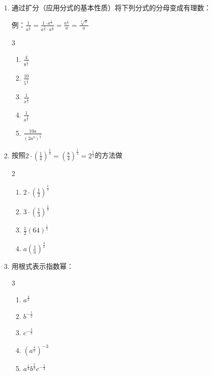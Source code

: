 \begin{enumerate}
\item 通过扩分（应用分式的基本性质）将下列分式的分母变成有理数：

例：$\frac{1}{a^{\tfrac{2}{3}}}=\frac{1\cdot a^{\tfrac{1}{3}}}{a^{\tfrac{2}{3}}\cdot a^{\tfrac{1}{3}}}=\frac{a^{\tfrac{1}{3}}}{a}=\frac{\sqrt[3]{a}}{a}$
\begin{multicols}{3}
    \begin{enumerate}
\item $\frac{4}{8^{\tfrac{1}{2}}}$
\item $\frac{10}{5^{\tfrac{1}{3}}}$
\item $\frac{1}{x^{\tfrac{1}{4}}}$
\item $\frac{1}{a^{\tfrac{2}{3}}}$
\item $\frac{10a}{(2a^3)^{\tfrac{1}{5}}}$
    \end{enumerate}
\end{multicols}

\item 按照$2\cdot \left(\frac{1}{4}\right)^{\tfrac{1}{3}}=\left(\frac{8}{4}\right)^{\tfrac{1}{3}}=2^{\tfrac{1}{3}}$的方法做
\begin{multicols}{2}
    \begin{enumerate}
\item $2\cdot \left(\frac{1}{2}\right)^{\tfrac{1}{3}}$
\item $3\cdot \left(\frac{1}{3}\right)^{\tfrac{1}{3}}$
\item $\frac{1}{2} \left(64\right)^{\tfrac{1}{5}}$
\item $a \left(\frac{1}{a}\right)^{\tfrac{3}{2}}$
    \end{enumerate}
\end{multicols}
\item 用根式表示指数幂：
\begin{multicols}{3}
    \begin{enumerate}
\item $a^{\tfrac{4}{5}}$
\item $b^{-\tfrac{1}{2}}$
\item $c^{-\tfrac{3}{5}}$
\item $\left(a^{\tfrac{4}{7}}\right)^{-3}$
\item $a^{\tfrac{1}{3}}b^{\tfrac{2}{3}}c^{-\tfrac{1}{3}}$
    \end{enumerate}
\end{multicols}


\end{enumerate}
